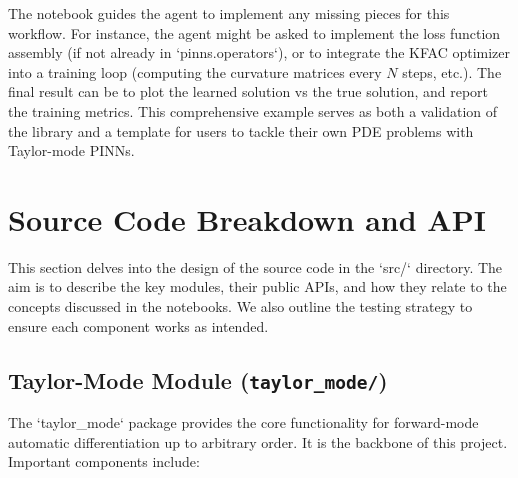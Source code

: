 \documentclass[11pt]{article}
\begin{document}
\begin{description}
  The notebook guides the agent to implement any missing pieces for this workflow. For instance, the agent might be asked to implement the loss function assembly (if not already in `pinns.operators`), or to integrate the KFAC optimizer into a training loop (computing the curvature matrices every $N$ steps, etc.). The final result can be to plot the learned solution vs the true solution, and report the training metrics. This comprehensive example serves as both a validation of the library and a template for users to tackle their own PDE problems with Taylor-mode PINNs.
\end{description}

\section{Source Code Breakdown and API}
\label{sec:src}

This section delves into the design of the source code in the `src/` directory. The aim is to describe the key modules, their public APIs, and how they relate to the concepts discussed in the notebooks. We also outline the testing strategy to ensure each component works as intended.

\subsection{Taylor-Mode Module (\texttt{taylor\_mode/})}

The `taylor_mode` package provides the core functionality for forward-mode automatic differentiation up to arbitrary order. It is the backbone of this project. Important components include:
\end{document}
